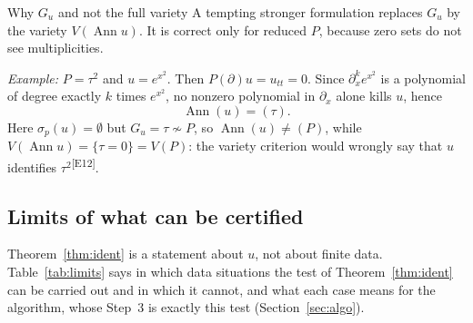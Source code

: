 \documentclass[11pt,a4paper]{article}
\theoremstyle{definition}
\newcommand{\edmark}[1]{\textsuperscript{\textcolor{cB}{\textsf{[#1]}}}}
\newcommand{\Ann}{\operatorname{Ann}}
\newcommand{\Var}{V}
\begin{document}
\begin{aside}{Why $G_u$ and not the full variety}
A tempting stronger formulation replaces $G_u$ by the variety $\Var(\Ann u)$. It is correct only for reduced $P$, because zero sets do not see multiplicities.

\emph{Example:} $P=\tau^2$ and $u=e^{x^2}$. Then $P(\partial)u=u_{tt}=0$. Since $\partial_x^ke^{x^2}$ is a polynomial of degree exactly $k$ times $e^{x^2}$, no nonzero polynomial in $\partial_x$ alone kills $u$, hence
\[
\Ann(u)=(\tau).
\]
Here $\sigma_p(u)=\emptyset$ but $G_u=\tau\not\sim P$, so $\Ann(u)\ne(P)$, while $\Var(\Ann u)=\{\tau=0\}=\Var(P)$: the variety criterion would wrongly say that $u$ identifies $\tau^2$\edmark{E12}.
\end{aside}



\subsection{Limits of what can be certified}\label{sec:ident-limits}
Theorem~\ref{thm:ident} is a statement about $u$, not about finite data. Table~\ref{tab:limits} says in which data situations the test of Theorem~\ref{thm:ident} can be carried out and in which it cannot, and what each case means for the algorithm, whose Step~3 is exactly this test (Section~\ref{sec:algo}).
\end{document}
